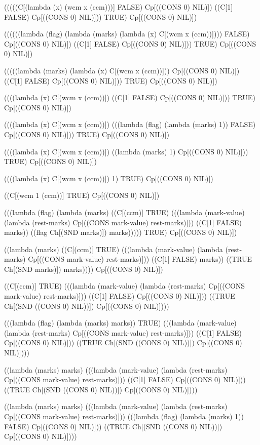 \documentclass{llncs}
\begin{document}
\begin{schemedisplay}
(((((C[(lambda (x) (wcm x (ccm)))] FALSE) Cp[((CONS 0) NIL)])
   ((C[1] FALSE) Cp[((CONS 0) NIL)]))
  TRUE) Cp[((CONS 0) NIL)])

((((((lambda (flag) (lambda (marks) (lambda (x) C[(wcm x (ccm))]))) FALSE) Cp[((CONS 0) NIL)])
   ((C[1] FALSE) Cp[((CONS 0) NIL)]))
  TRUE) Cp[((CONS 0) NIL)])

(((((lambda (marks) (lambda (x) C[(wcm x (ccm))])) Cp[((CONS 0) NIL)])
   ((C[1] FALSE) Cp[((CONS 0) NIL)]))
  TRUE) Cp[((CONS 0) NIL)])

((((lambda (x) C[(wcm x (ccm))])
   ((C[1] FALSE) Cp[((CONS 0) NIL)]))
  TRUE) Cp[((CONS 0) NIL)])

((((lambda (x) C[(wcm x (ccm))])
   (((lambda (flag) (lambda (marks) 1)) FALSE) Cp[((CONS 0) NIL)]))
  TRUE) Cp[((CONS 0) NIL)])

((((lambda (x) C[(wcm x (ccm))])
   ((lambda (marks) 1) Cp[((CONS 0) NIL)]))
  TRUE) Cp[((CONS 0) NIL)])

((((lambda (x) C[(wcm x (ccm))])
   1) TRUE) Cp[((CONS 0) NIL)])

((C[(wcm 1 (ccm))]
   TRUE) Cp[((CONS 0) NIL)])

(((lambda (flag)
    (lambda (marks)
      ((C[(ccm)] TRUE)
       (((lambda (mark-value) (lambda (rest-marks) Cp[((CONS mark-value) rest-marks)]))
         ((C[1] FALSE) marks))
        ((flag Ch[(SND marks)]) marks)))))
  TRUE) Cp[((CONS 0) NIL)])

((lambda (marks)
   ((C[(ccm)] TRUE)
    (((lambda (mark-value) (lambda (rest-marks) Cp[((CONS mark-value) rest-marks)]))
      ((C[1] FALSE) marks))
     ((TRUE Ch[(SND marks)]) marks))))
 Cp[((CONS 0) NIL)])

((C[(ccm)] TRUE)
 (((lambda (mark-value) (lambda (rest-marks) Cp[((CONS mark-value) rest-marks)]))
   ((C[1] FALSE) Cp[((CONS 0) NIL)]))
  ((TRUE Ch[(SND ((CONS 0) NIL))]) Cp[((CONS 0) NIL)])))

(((lambda (flag) (lambda (marks) marks))
  TRUE)
 (((lambda (mark-value) (lambda (rest-marks) Cp[((CONS mark-value) rest-marks)]))
   ((C[1] FALSE) Cp[((CONS 0) NIL)]))
  ((TRUE Ch[(SND ((CONS 0) NIL))]) Cp[((CONS 0) NIL)])))

((lambda (marks) marks)
 (((lambda (mark-value) (lambda (rest-marks) Cp[((CONS mark-value) rest-marks)]))
   ((C[1] FALSE) Cp[((CONS 0) NIL)]))
  ((TRUE Ch[(SND ((CONS 0) NIL))]) Cp[((CONS 0) NIL)])))

((lambda (marks) marks)
 (((lambda (mark-value) (lambda (rest-marks) Cp[((CONS mark-value) rest-marks)]))
   (((lambda (flag) (lambda (marks) 1)) FALSE) Cp[((CONS 0) NIL)]))
  ((TRUE Ch[(SND ((CONS 0) NIL))]) Cp[((CONS 0) NIL)])))


\end{schemedisplay}
\end{document}
